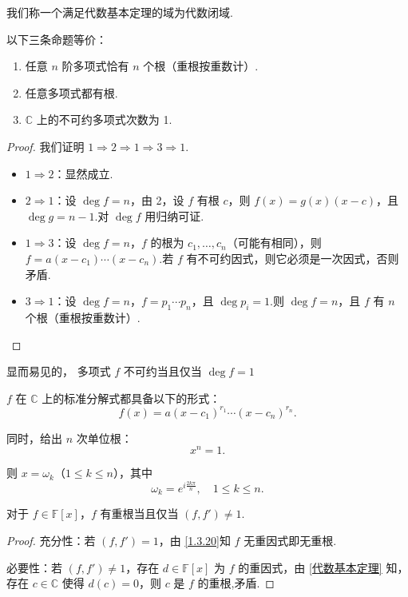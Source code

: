 我们称一个满足代数基本定理的域为代数闭域.
\begin{proposition}
	以下三条命题等价：
	\begin{enumerate}
		\item 任意 \( n \) 阶多项式恰有 \( n \) 个根（重根按重数计）.
		\item 任意多项式都有根.
		\item \( \mathbb{C} \) 上的不可约多项式次数为 1.
	\end{enumerate}
	
	
\end{proposition}
\begin{proof}
	我们证明 \( 1 \Rightarrow 2 \Rightarrow 1 \Rightarrow 3 \Rightarrow 1 \).
	
	\begin{itemize}
		\item \( 1 \Rightarrow 2 \)：显然成立.
		
		\item \( 2 \Rightarrow 1 \)：设 \( \deg f = n \)，由 2，设 \( f \) 有根 \( c \)，则 \( f(x) = g(x)(x - c) \)，且 \( \deg g = n - 1 \).对 \( \deg f \) 用归纳可证.
		
		\item \( 1 \Rightarrow 3 \)：设 \( \deg f = n \)，\( f \) 的根为 \( c_1, \ldots, c_n \)（可能有相同），则 \( f = a(x - c_1) \cdots (x - c_n) \).若 \( f \) 有不可约因式，则它必须是一次因式，否则矛盾.
		
		\item \( 3 \Rightarrow 1 \)：设 \( \deg f = n \)，\( f = p_1 \cdots p_n \)，且 \( \deg p_i = 1 \).则 \( \deg f = n \)，且 \( f \) 有 \( n \) 个根（重根按重数计）.
	\end{itemize}
\end{proof}

显而易见的，
多项式 \( f \) 不可约当且仅当 \( \deg f = 1 \)

\( f \) 在 \( \mathbb{C} \) 上的标准分解式都具备以下的形式：
\[ f(x) = a(x - c_1)^{r_1} \cdots (x - c_n)^{r_n}. \]

同时，给出 \( n \) 次单位根：
\[ x^n = 1. \]

则 \( x = \omega_k \)（\( 1 \leq k \leq n \)），其中
\[ \omega_k = e^{i\frac{ 2 k \pi}{n}}, \quad 1 \leqslant k \leqslant n.\]

\begin{corollary}
对于 \( f \in \mathbb{F}[x] \)，\( f \) 有重根当且仅当 \( (f, f') \neq 1 \).
\end{corollary}
\begin{proof}
	充分性：若 \( (f, f') = 1 \)，由 \ref{1.3.20}知 \( f \) 无重因式即无重根.
	
	必要性：若 \( (f, f') \neq 1 \)，存在 \( d \in \mathbb{F}[x] \) 为 \( f \) 的重因式，由 \ref{代数基本定理} 知，存在 \( c \in \mathbb{C} \) 使得 \( d(c) = 0 \)，则 \( c \) 是 \( f \) 的重根,矛盾.
	
\end{proof}
